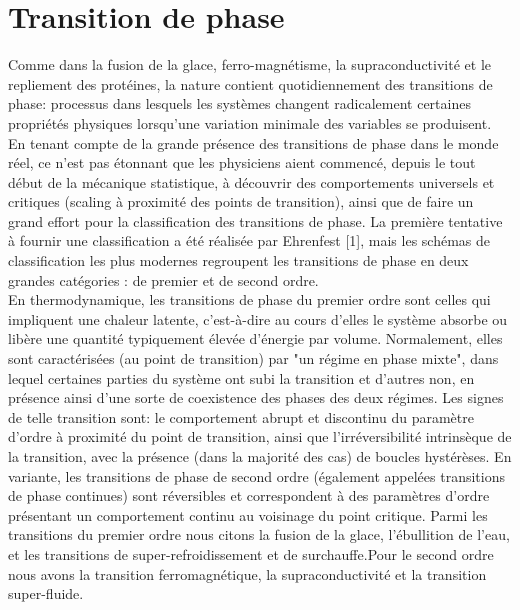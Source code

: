 \section{Transition de phase}
Comme dans la fusion de la glace, ferro-magnétisme, la supraconductivité et le repliement des protéines, la nature contient quotidiennement des transitions de phase: processus dans lesquels les systèmes changent radicalement certaines propriétés physiques lorsqu'une variation minimale des variables se produisent.\\
En tenant compte de la grande présence des transitions de phase dans le monde réel, ce n'est pas étonnant que les physiciens aient commencé, depuis le tout début de la mécanique statistique, à découvrir des comportements universels et critiques (scaling à proximité des points de transition), ainsi que de faire un grand effort pour la classification des transitions de phase. La première tentative à fournir une classification a été réalisée par Ehrenfest [1], mais les schémas de classification les plus modernes regroupent les transitions de phase en deux grandes catégories : de premier et de second ordre.\\
En thermodynamique, les transitions de phase du premier ordre sont celles qui impliquent une chaleur latente, c'est-à-dire au cours d'elles le système absorbe ou libère une quantité typiquement élevée d'énergie par volume. Normalement, elles sont caractérisées (au point de transition) par "un régime en phase mixte", dans lequel certaines parties du système ont subi la transition et d'autres non, en présence ainsi d'une sorte de coexistence des phases des deux régimes. Les signes de telle transition sont: le comportement abrupt et discontinu du paramètre d'ordre à proximité du point de transition, ainsi que l'irréversibilité intrinsèque de la transition, avec la présence (dans la majorité des cas) de boucles hystérèses. En variante, les transitions de phase de second ordre (également appelées transitions de phase continues) sont réversibles et correspondent à des paramètres d'ordre présentant un comportement continu au voisinage du point critique.
Parmi les transitions du premier ordre nous citons la fusion de la glace, l'ébullition de l'eau, et les transitions de super-refroidissement et de surchauffe.Pour le second ordre nous avons la transition ferromagnétique, la supraconductivité et la transition super-fluide.
